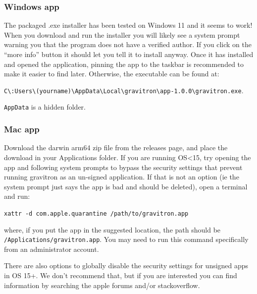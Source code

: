 \documentclass{pfpe-manual}
\begin{document}
\subsubsection{Windows app}
The packaged .exe installer has been tested on Windows 11 and it seems to work! When you download and run the installer you will likely see a system prompt warning you that the program does not have a verified author. If you click on the ``more info'' button it should let you tell it to install anyway. Once it has installed and opened the application, pinning the app to the taskbar is recommended to make it easier to find later. Otherwise, the executable can be found at: 

\texttt{C\textbackslash :Users\textbackslash (yourname)\textbackslash AppData\textbackslash Local\textbackslash gravitron\textbackslash app-1.0.0\textbackslash gravitron.exe}. 

\noindent \texttt{AppData} is a hidden folder.

\subsubsection{Mac app}
Download the darwin arm64 zip file from the releases page, and place the download in your Applications folder. If you are running OS<15, try opening the app and following system prompts to bypass the security settings that prevent running gravitron as an un-signed application. If that is not an option (ie the system prompt just says the app is bad and should be deleted), open a terminal and run:

\texttt{xattr -d com.apple.quarantine /path/to/gravitron.app}

\noindent where, if you put the app in the suggested location, the path should be \texttt{/Applications/gravitron.app}. You may need to run this command specifically from an administrator account.

There are also options to globally disable the security settings for unsigned apps in OS 15+. We don't recommend that, but if you are interested you can find information by searching the apple forums and/or stackoverflow.
\end{document}
